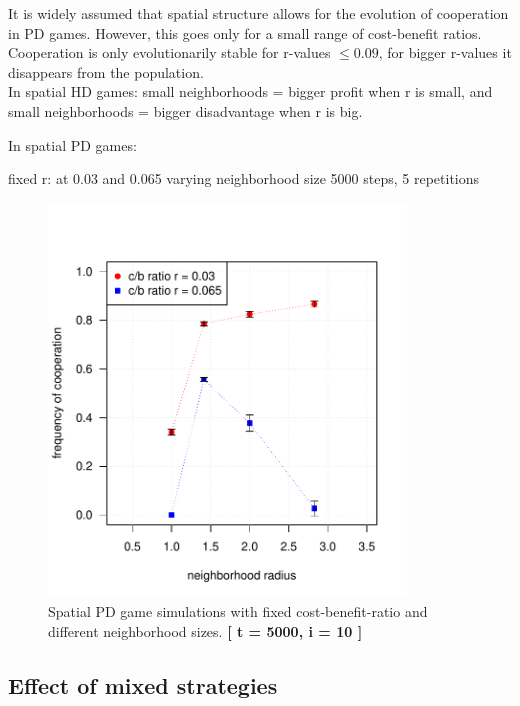 It is widely assumed that spatial structure allows for the evolution of cooperation in PD games. However, this goes only for a small range of cost-benefit ratios. Cooperation is only evolutionarily stable for r-values $ \leq 0.09$, for bigger r-values it disappears from the population.\\
 
In spatial HD games: small neighborhoods = bigger profit when r is small, and small neighborhoods = bigger disadvantage when r is big.

In spatial PD games: 


fixed r: at 0.03 and 0.065
varying neighborhood size
5000 steps, 5 repetitions

\begin{figure}[H]
	\centering 
	\includegraphics[width=9.5cm]{task2_radiusplot}
	\caption{Spatial PD game simulations with fixed cost-benefit-ratio and different neighborhood sizes.  \textbf{[ t = 5000, i = 10 ]} }\label{fig: task2_radiusplot}
\end{figure}


\subsection{Effect of mixed strategies}

